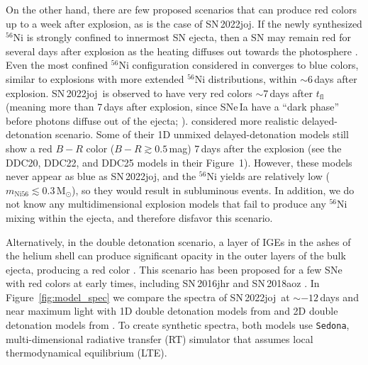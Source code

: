 \documentclass[twocolumn]{aastex631}
\newcommand{\sn}{SN\,2022joj}
\begin{document}
\begin{CJK*}{UTF8}{gbsn}
On the other hand, there are few proposed scenarios that can produce red colors up to a week after explosion, as is the case of \sn. If the newly synthesized $^{56}$Ni is strongly confined to innermost SN ejecta, then a SN may remain red for several days after explosion as the heating diffuses out towards the photosphere \citep{Piro_2016}. Even the most confined $^{56}$Ni configuration considered in \citet{Piro_2016} converges to blue colors, similar to explosions with more extended $^{56}$Ni distributions, within $\sim$6\,days after explosion. \sn\ is observed to have very red colors $\sim$7\,days after $t_\mathrm{fl}$ (meaning more than 7\,days after explosion, since SNe\,Ia have a ``dark phase'' before photons diffuse out of the ejecta; \citealt{Piro_2013}). \citet{Dessart_2014} considered more realistic delayed-detonation scenario. Some of their 1D unmixed delayed-detonation models still show a red $B-R$ color ($B-R\gtrsim0.5$\,mag) 7\,days after the explosion (see the DDC20, DDC22, and DDC25 models in their Figure~1). However, these models never appear as blue as \sn, and the $^{56}$Ni yields are relatively low ($m_\mathrm{Ni56}\lesssim0.3\,\mathrm{M_\odot}$), so they would result in subluminous events. In addition, we do not know any multidimensional explosion models that fail to produce any $^{56}$Ni mixing within the ejecta, and therefore disfavor this scenario.

Alternatively, in the double detonation scenario, a layer of IGEs in the ashes of the helium shell can produce significant opacity in the outer layers of the bulk ejecta, producing a red color \citep{polin_observational_2019}. This scenario has been proposed for a few SNe with red colors at early times, including SN\,2016jhr \citep{jiang_16jhr_2017} and SN\,2018aoz \citep{Ni_2022}. In Figure~\ref{fig:model_spec} we compare the spectra of \sn\ at $\sim$$-12$\,days and near maximum light with 1D double detonation models from \citet{polin_observational_2019} and 2D double detonation models from \citet{Shen_2D_2021}. To create synthetic spectra, both models use \texttt{Sedona}, multi-dimensional radiative transfer (RT) simulator that assumes local thermodynamical equilibrium (LTE).


\end{CJK*}
\end{document}
